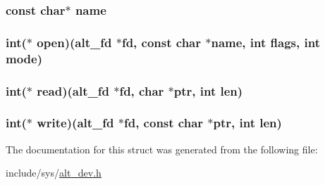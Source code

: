 \hypertarget{structalt__dev__s_a8f8f80d37794cde9472343e4487ba3eb}{
\subsubsection[{name}]{\setlength{\rightskip}{0pt plus 5cm}const char$\ast$ {\bf name}}}\label{structalt__dev__s_a8f8f80d37794cde9472343e4487ba3eb}
\hypertarget{structalt__dev__s_afedc84b0c25763ecb200e2fdf6b3919a}{
\subsubsection[{open}]{\setlength{\rightskip}{0pt plus 5cm}int($\ast$ {\bf open})({\bf alt\-\_\-fd} $\ast$fd, const char $\ast${\bf name}, int flags, int mode)}}\label{structalt__dev__s_afedc84b0c25763ecb200e2fdf6b3919a}
\hypertarget{structalt__dev__s_a6343e4469a0a96fe7dffde448bdca372}{
\subsubsection[{read}]{\setlength{\rightskip}{0pt plus 5cm}int($\ast$ {\bf read})({\bf alt\-\_\-fd} $\ast$fd, char $\ast$ptr, int len)}}\label{structalt__dev__s_a6343e4469a0a96fe7dffde448bdca372}
\hypertarget{structalt__dev__s_a9abad625f9dea6bbf3aa495678ccd894}{
\subsubsection[{write}]{\setlength{\rightskip}{0pt plus 5cm}int($\ast$ {\bf write})({\bf alt\-\_\-fd} $\ast$fd, const char $\ast$ptr, int len)}}\label{structalt__dev__s_a9abad625f9dea6bbf3aa495678ccd894}


\-The documentation for this struct was generated from the following file\-:\begin{DoxyCompactItemize}
\item 
include/sys/\hyperlink{alt__dev_8h}{alt\-\_\-dev.\-h}\end{DoxyCompactItemize}
